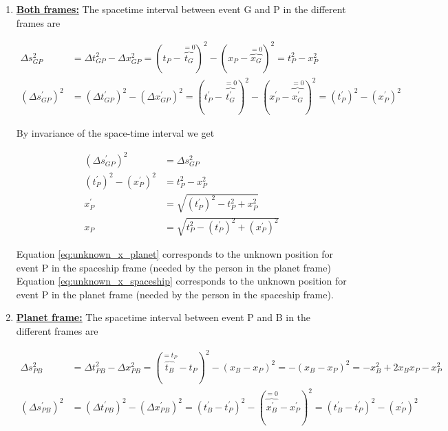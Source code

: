 \documentclass[a4paper,10pt,english]{article}
\begin{document}
\begin{enumerate}
\begin{enumerate}
\item \underline{\bf{Both frames:}} The spacetime interval between event G and P in the different frames are

\begin{align*}
\Delta s_{GP}^2&=\Delta t_{GP}^2-\Delta x_{GP}^2=(t_{P}-\overbrace{t_{G}}^{=0})^2-(x_{P}-\overbrace{x_{G}}^{=0})^2=t_{P}^2-x_{P}^2\\
(\Delta s_{GP}^{\prime})^2&=(\Delta t_{GP}^{\prime})^2-(\Delta x_{GP}^{\prime})^2=(t_{P}^{\prime}-\overbrace{t^{\prime}_{G}}^{=0})^2-(x_{P}^{\prime}-\overbrace{x^{\prime}_{G}}^{=0})^2=(t_{P}^{\prime})^2-(x_{P}^{\prime})^2
\end{align*}

By invariance of the space-time interval we get

\begin{align}
(\Delta s_{GP}^{\prime})^2&=\Delta s_{GP}^2 \nonumber\\
(t^{\prime}_{P})^{2}-(x^{\prime}_{P})^{2}&=t_{P}^{2}-x_{P}^{2} \nonumber\\
x^{\prime}_{P}&=\sqrt{(t^{\prime}_{P})^{2}-t_{P}^{2}+x_{P}^{2}} \label{eq:unknown_x_planet}\\
x_{P}&=\sqrt{t_{P}^{2}-(t^{\prime}_{P})^{2}+(x^{\prime}_{P})^{2}} \label{eq:unknown_x_spaceship}
\end{align}

Equation \ref{eq:unknown_x_planet} corresponds to the unknown position for event P in the spaceship frame (needed by the person in the planet frame)\\
Equation \ref{eq:unknown_x_spaceship} corresponds to the unknown position for event P in the planet frame (needed by the person in the spaceship frame).


\item \underline{\bf{Planet frame:}} The spacetime interval between event P and B in the different frames are

\begin{align*}
\Delta s_{PB}^2&=\Delta t_{PB}^2-\Delta x_{PB}^2=(\overbrace{t_{B}}^{=t_{P}}-t_{P})^2-(x_{B}-x_{P})^2=-(x_{B}-x_{P})^2=-x_{B}^2+2x_{B}x_{P}-x_{P}^2\\
(\Delta s_{PB}^{\prime})^2&=(\Delta t_{PB}^{\prime})^2-(\Delta x_{PB}^{\prime})^2=(t_{B}^{\prime}-t^{\prime}_{P})^2-(\overbrace{x_{B}^{\prime}}^{=0}-x^{\prime}_{P})^2=(t_{B}^{\prime}-t^{\prime}_{P})^2-(x^{\prime}_{P})^2
\end{align*}


\end{enumerate}
\end{enumerate}
\end{document}
